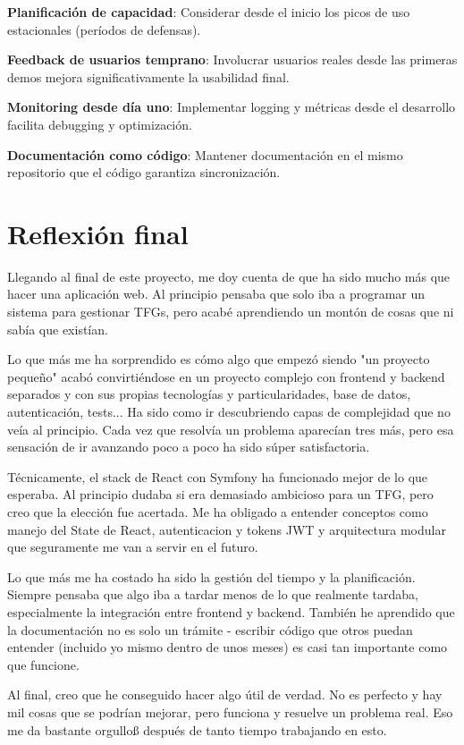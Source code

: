 \documentclass[12pt,a4paper,oneside]{report}
\begin{document}
\textbf{Planificación de capacidad}: Considerar desde el inicio los
picos de uso estacionales (períodos de defensas).

\textbf{Feedback de usuarios temprano}: Involucrar usuarios reales desde
las primeras demos mejora significativamente la usabilidad final.

\textbf{Monitoring desde día uno}: Implementar logging y métricas desde
el desarrollo facilita debugging y optimización.

\textbf{Documentación como código}: Mantener documentación en el mismo
repositorio que el código garantiza sincronización.

\section{Reflexión final}\label{reflexiuxf3n-final}

Llegando al final de este proyecto, me doy cuenta de que ha sido mucho más que hacer una aplicación web. Al principio pensaba que solo iba a programar un sistema para gestionar TFGs, pero acabé aprendiendo un montón de cosas que ni sabía que existían.

Lo que más me ha sorprendido es cómo algo que empezó siendo "un proyecto pequeño" acabó convirtiéndose en un proyecto complejo con frontend y backend separados y con sus propias tecnologías y particularidades, base de datos, autenticación, tests... Ha sido como ir descubriendo capas de complejidad que no veía al principio. Cada vez que resolvía un problema aparecían tres más, pero esa sensación de ir avanzando poco a poco ha sido súper satisfactoria.

Técnicamente, el stack de React con Symfony ha funcionado mejor de lo que esperaba. Al principio dudaba si era demasiado ambicioso para un TFG, pero creo que la elección fue acertada. Me ha obligado a entender conceptos como manejo del State de React, autenticacion y tokens JWT y arquitectura modular que seguramente me van a servir en el futuro.

Lo que más me ha costado ha sido la gestión del tiempo y la planificación. Siempre pensaba que algo iba a tardar menos de lo que realmente tardaba, especialmente la integración entre frontend y backend. También he aprendido que la documentación no es solo un trámite - escribir código que otros puedan entender (incluido yo mismo dentro de unos meses) es casi tan importante como que funcione.

Al final, creo que he conseguido hacer algo útil de verdad. No es perfecto y hay mil cosas que se podrían mejorar, pero funciona y resuelve un problema real. Eso me da bastante orgulloß después de tanto tiempo trabajando en esto.
\end{document}
